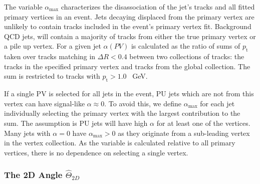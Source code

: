 The variable $\alpha_{\textrm{max}}$ characterizes the disassociation of the jet's tracks and all fitted primary vertices 
in an event.
Jets decaying displaced from the primary vertex are unlikely to contain tracks 
included in the event's primary vertex fit.
Background QCD jets, will contain a majority of tracks from either the true primary vertex or a pile up vertex.
For a given jet $\alpha(PV)$ is calculated as the ratio of sums of $p_{\textrm{t}}$ taken over tracks matching in $\Delta R< 0.4$ between two
collections of tracks: the tracks in the specified primary vertex and tracks from the global collection. 
The sum is restricted to tracks with $p_{\textrm{t}}> 1.0$ ~GeV. 



If a single PV is selected for all jets in the event, PU jets which are not from this vertex can have signal-like $\alpha \approx 0$. 
To avoid this, we define $\alpha_{\textrm{max}}$ for each jet individually selecting the primary vertex with
the largest contribution to the sum. The assumption is PU jets will have high $\alpha$ for at least one 
of the vertices. Many jets with $\alpha = 0$ have $\alpha_{\textrm{max}} > 0$ as they originate
from a sub-leading vertex in the vertex collection. As the variable is calculated relative to all primary
vertices, there is no dependence on selecting a single vertex. 

\subsubsection{The 2D Angle $\widehat{\Theta}_{2D}$}

